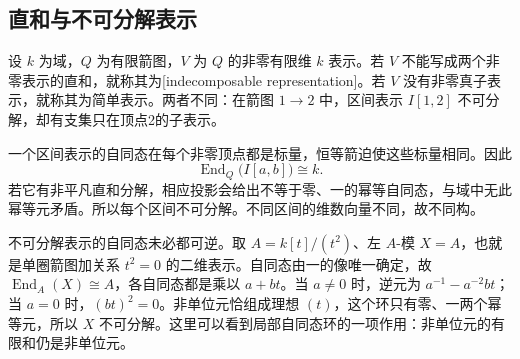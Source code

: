 \subsection{直和与不可分解表示}
\label{b5:subsec:0903:02}

\begin{definition}\label{b5:def:indecomposable-quiver-representation}
	设 \(k\) 为域，\(Q\) 为有限箭图，\(V\) 为 \(Q\) 的非零有限维 \(k\) 表示。若 \(V\) 不能写成两个非零表示的直和，就称其为[indecomposable representation]。若 \(V\) 没有非零真子表示，就称其为简单表示。两者不同：在箭图 \(1\to2\) 中，区间表示 \(I[1,2]\) 不可分解，却有支集只在顶点2的子表示。
\end{definition}
一个区间表示的自同态在每个非零顶点都是标量，恒等箭迫使这些标量相同。因此
\[
	\operatorname{End}_Q\bigl(I[a,b]\bigr)\cong k.
\]
若它有非平凡直和分解，相应投影会给出不等于零、一的幂等自同态，与域中无此幂等元矛盾。所以每个区间不可分解。不同区间的维数向量不同，故不同构。

\ProseParagraphBreak

不可分解表示的自同态未必都可逆。取 \(A=k[t]/(t^2)\)、左 \(A\)-模 \(X=A\)，也就是单圈箭图加关系 \(t^2=0\) 的二维表示。自同态由一的像唯一确定，故 \(\operatorname{End}_A(X)\cong A\)，各自同态都是乘以 \(a+bt\)。当 \(a\ne0\) 时，逆元为 \(a^{-1}-a^{-2}bt\)；当 \(a=0\) 时，\((bt)^2=0\)。非单位元恰组成理想 \((t)\)，这个环只有零、一两个幂等元，所以 \(X\) 不可分解。这里可以看到局部自同态环的一项作用：非单位元的有限和仍是非单位元。

\ProseParagraphBreak

